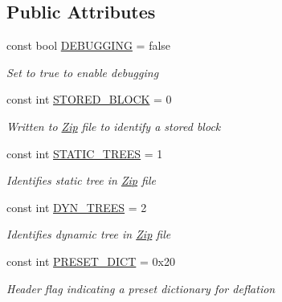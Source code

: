 \subsection*{Public Attributes}
\begin{DoxyCompactItemize}
\item 
const bool \hyperlink{class_i_c_sharp_code_1_1_sharp_zip_lib_1_1_zip_1_1_compression_1_1_deflater_constants_ae91ec17ed3a659d30f2771ef84938e93}{D\+E\+B\+U\+G\+G\+I\+NG} = false
\begin{DoxyCompactList}\small\item\em Set to true to enable debugging \end{DoxyCompactList}\item 
const int \hyperlink{class_i_c_sharp_code_1_1_sharp_zip_lib_1_1_zip_1_1_compression_1_1_deflater_constants_a66cc3b5b4851ef4d7fa04e74009ce036}{S\+T\+O\+R\+E\+D\+\_\+\+B\+L\+O\+CK} = 0
\begin{DoxyCompactList}\small\item\em Written to \hyperlink{namespace_i_c_sharp_code_1_1_sharp_zip_lib_1_1_zip}{Zip} file to identify a stored block \end{DoxyCompactList}\item 
const int \hyperlink{class_i_c_sharp_code_1_1_sharp_zip_lib_1_1_zip_1_1_compression_1_1_deflater_constants_a8f7099560b504efb8cf6ff25da9f7df3}{S\+T\+A\+T\+I\+C\+\_\+\+T\+R\+E\+ES} = 1
\begin{DoxyCompactList}\small\item\em Identifies static tree in \hyperlink{namespace_i_c_sharp_code_1_1_sharp_zip_lib_1_1_zip}{Zip} file \end{DoxyCompactList}\item 
const int \hyperlink{class_i_c_sharp_code_1_1_sharp_zip_lib_1_1_zip_1_1_compression_1_1_deflater_constants_a4675667c671193058ac713f347030ba5}{D\+Y\+N\+\_\+\+T\+R\+E\+ES} = 2
\begin{DoxyCompactList}\small\item\em Identifies dynamic tree in \hyperlink{namespace_i_c_sharp_code_1_1_sharp_zip_lib_1_1_zip}{Zip} file \end{DoxyCompactList}\item 
const int \hyperlink{class_i_c_sharp_code_1_1_sharp_zip_lib_1_1_zip_1_1_compression_1_1_deflater_constants_ada78cb8616d636cda35b1719ef160aee}{P\+R\+E\+S\+E\+T\+\_\+\+D\+I\+CT} = 0x20
\begin{DoxyCompactList}\small\item\em Header flag indicating a preset dictionary for deflation \end{DoxyCompactList}\item 

\end{DoxyCompactItemize}
